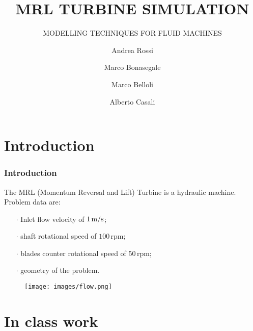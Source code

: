 \documentclass[aspectratio=169]{beamer}
\title[MRL TURBINE]{MRL TURBINE SIMULATION}
\subtitle{MODELLING TECHNIQUES FOR FLUID MACHINES}
\author[AR MB MB AC]{Andrea Rossi \and Marco Bonasegale \and Marco Belloli \and Alberto Casali}
\date{}
\begin{document}

\begin{frame}
\titlepage
\end{frame}

\addtocounter{framenumber}{-1}


%







\section{Introduction}

\begin{frame}
\frametitle{Introduction}
The MRL (Momentum Reversal and Lift) Turbine is a hydraulic machine.
Problem data are:
\begin{itemize}
\item[$\cdot$] Inlet flow velocity of $1\,\text{m}/\text{s}$;
\item[$\cdot$] shaft rotational speed of $100 \, \text{rpm}$;
\item[$\cdot$] blades counter rotational speed of $50 \, \text{rpm}$;
\item[$\cdot$] geometry of the problem.
\end{itemize}

\begin{center}
\begin{figure}
\texttt{[image: images/flow.png]} 

\end{figure}
\end{center}


\end{frame}

\section{In class work}
\end{document}

